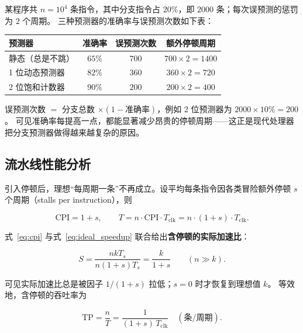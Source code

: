 \begin{example}[分支预测准确率与误预测代价]
某程序共 $n = 10^4$ 条指令，其中分支指令占 $20\%$，即 $2000$ 条；每次误预测的惩罚为 $2$ 个周期。
三种预测器的准确率与误预测次数如下表：

\begin{center}
\begin{tabular}{lccc}
\toprule
\textbf{预测器} & \textbf{准确率} & \textbf{误预测次数} & \textbf{额外停顿周期} \\
\midrule
静态（总是不跳） & $65\%$ & $700$ & $700 \times 2 = 1400$ \\
1 位动态预测器   & $82\%$ & $360$ & $360 \times 2 = 720$ \\
2 位饱和计数器   & $90\%$ & $200$ & $200 \times 2 = 400$ \\
\bottomrule
\end{tabular}
\end{center}

误预测次数 $=$ 分支总数 $\times (1 - \text{准确率})$，例如 2 位预测器为 $2000 \times 10\% = 200$。
可见准确率每提高一点，都能显著减少昂贵的停顿周期——这正是现代处理器把分支预测器做得越来越复杂的原因。
\end{example}

\subsection{流水线性能分析}

引入停顿后，理想“每周期一条”不再成立。设平均每条指令因各类冒险额外停顿 $s$ 个周期（stalls per instruction），则

\begin{equation}
\text{CPI} = 1 + s,
\qquad
T = n \cdot \text{CPI} \cdot T_{\text{clk}} = n \cdot (1 + s) \cdot T_{\text{clk}} .
\label{eq:cpi}
\end{equation}

式~\eqref{eq:cpi} 与式~\eqref{eq:ideal_speedup} 联合给出\textbf{含停顿的实际加速比}：

\begin{equation}
S = \frac{n k T_s}{n (1+s) T_s} = \frac{k}{1 + s}
\qquad (n \gg k).
\label{eq:speedup_stall}
\end{equation}

可见实际加速比总是被因子 $1/(1+s)$ 拉低；$s = 0$ 时才恢复到理想值 $k$。
等效地，含停顿的吞吐率为

\begin{equation}
\text{TP} = \frac{n}{T} = \frac{1}{(1+s)\,T_{\text{clk}}} \quad (\text{条/周期}) .
\label{eq:tp_stall}
\end{equation}

